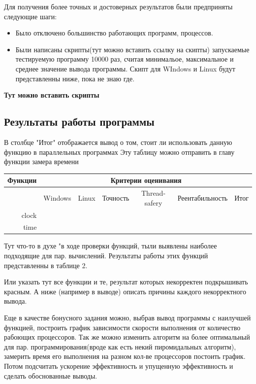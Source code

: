 \documentclass{article}
\begin{document}
			Для получения более точных и достоверных результатов были предприняты следующие шаги:
			
			\begin{itemize}
				\item Было отключено большинство работающих программ, процессов.
				\item Были написаны скрипты(тут можно вставить ссылку на скипты) запускаемые тестируемую программу 10000 раз, 							считая минимальое, максимальное и среднее значение вывода программы. Скипт для WIndows и Linux будут 								представленны ниже, пока не знаю где. 
			\end{itemize}			
		\begin{center}
			 \textbf{Тут можно вставить скрипты}
		\end{center}
			
		\subsection{Результаты работы программы}
		В столбце "Итог" отображается вывод о том, стоит ли использовать данную функцию в параллельных программах
		Эту таблицу можно отправить в главу функции замера времени
		\begin{table}
			\begin{tabular}{|r|l|c|c|c|c|c|} 
			\hline
			Функции	& \multicolumn{6}{|c|}{ Критерии оценивания	}\\
			\hline
			\qquad & Windows & Linux & Точность & Thread-safery & Реентабильность & Итог \\
			\hline
			clock	\\
			time	\\
			\end{tabular}		
		\end{table}
		
			Тут что-то в духе "в ходе проверки функций, тыли выявлены наиболее подходящие для пар. вычислений. Результаты работы 			этих функций представленны в таблице 2. 
		
			Или указать тут все функции и те, результат которых некорректен подкрышивать красным. А ниже (например в выводе) 				описать причины каждого некорректного вывода.
			
			Еще в качестве бонусного задания можно, выбрав вывод программы с наилучшей функцией, построить график зависимости 				скорости выполнения от количество рабоющих процессоров. Так же можно изменить алгоритм на более оптимальный для пар. 				программирования(вроде как есть некий пиромидальных алгоритм), замерить время его выполнения на разном кол-ве процессоров 		постоить график. Потом подсчитать ускорение эффективность и упущенную эффективность и сделать 					обоснованные выводы.
		
\end{document}
